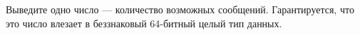 Выведите одно число --- количество возможных сообщений. Гарантируется, что это число влезает в беззнаковый 64-битный целый тип данных.